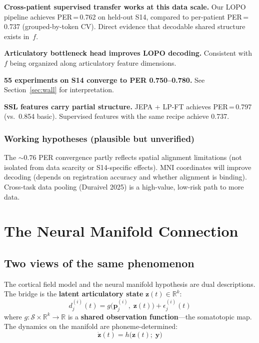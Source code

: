 \documentclass[11pt,letterpaper]{article}
\newcommand{\bfp}{\mathbf{p}}
\newcommand{\bfz}{\mathbf{z}}
\newcommand{\bfy}{\mathbf{y}}
\newcommand{\cS}{\mathcal{S}}
\newcommand{\R}{\mathbb{R}}
\begin{document}
\textbf{Cross-patient supervised transfer works at this data scale.} Our LOPO pipeline achieves PER\,=\,0.762 on held-out S14, compared to per-patient PER\,=\,0.737 (grouped-by-token CV). Direct evidence that decodable shared structure exists in~$f$.

\textbf{Articulatory bottleneck head improves LOPO decoding.} Consistent with $f$ being organized along articulatory feature dimensions.

\textbf{55 experiments on S14 converge to PER 0.750--0.780.} See Section~\ref{sec:wall} for interpretation.

\textbf{SSL features carry partial structure.} JEPA + LP-FT achieves PER\,=\,0.797 (vs.\ 0.854 basic). Supervised features with the same recipe achieve 0.737.

\subsubsection{Working hypotheses (plausible but unverified)}

The ${\sim}0.76$ PER convergence partly reflects spatial alignment limitations (not isolated from data scarcity or S14-specific effects). MNI coordinates will improve decoding (depends on registration accuracy and whether alignment is binding). Cross-task data pooling (Duraivel 2025) is a high-value, low-risk path to more data.


\section{The Neural Manifold Connection}\label{sec:manifold}

\subsection{Two views of the same phenomenon}

The cortical field model and the neural manifold hypothesis are dual descriptions. The bridge is the \textbf{latent articulatory state} $\bfz(t) \in \R^k$:
\begin{equation}\label{eq:obs-function}
\boxed{d_j^{(i)}(t) = g\bigl(\bfp_j^{(i)},\; \bfz(t)\bigr) + \epsilon_j^{(i)}(t)}
\end{equation}
where $g: \cS \times \R^k \to \R$ is a \textbf{shared observation function}---the somatotopic map. The dynamics on the manifold are phoneme-determined:
\begin{equation}\label{eq:dynamics}
\dot{\bfz}(t) = h\bigl(\bfz(t);\; \bfy\bigr)
\end{equation}
\end{document}
